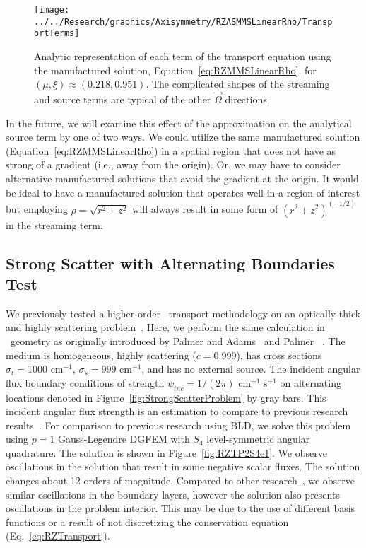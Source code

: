 \documentclass[12pt]{article}
\begin{document}
\begin{figure}
\texttt{[image: ../../Research/graphics/Axisymmetry/RZASMMSLinearRho/TransportTerms]}
\caption{Analytic representation of each term of the transport equation using the manufactured solution, Equation~\ref{eq:RZMMSLinearRho}, for $(\mu,\xi) \approx (0.218,0.951)$. The complicated shapes of the streaming and source terms are typical of the other $\vec{\Omega}$ directions.}
\label{fig:RZMMSLinearRhoAnalytic}
\end{figure}

In the future, we will examine this effect of the approximation on the analytical source term by one of two ways. We could utilize the same manufactured solution (Equation~\ref{eq:RZMMSLinearRho}) in a spatial region that does not have as strong of a gradient (i.e., away from the origin). Or, we may have to consider alternative manufactured solutions that avoid the gradient at the origin. It would be ideal to have a manufactured solution that operates well in a region of interest but employing $\rho=\sqrt{r^2+z^2}$ will always result in some form of $\left(r^2+z^2 \right)^{(-1/2)}$ in the streaming term.

\FloatBarrier

\subsection{Strong Scatter with Alternating Boundaries Test}
\label{sec:RZStrongScatter}
We previously tested a higher-order \XY\ transport methodology on an optically thick and highly scattering problem~\cite{WoodsHoDgfemXyCurved}. Here, we perform the same calculation in \RZ\ geometry as originally introduced by Palmer and Adams~\cite{PalmerCurvilinearTransport} and Palmer~
\cite{PalmerDissertation}. The medium is homogeneous, highly scattering ($c=0.999$), has cross sections $\sigma_t=1000 \text{ cm}^{-1}$, $\sigma_s = 999 \text{ cm}^{-1}$, and has no external source. The incident angular flux boundary conditions of strength $\psi_{inc} = 1/(2 \pi) \text{ cm}^{-1} \text{ s}^{-1}$ on alternating locations denoted in Figure~\ref{fig:StrongScatterProblem} by gray bars. This incident angular flux strength is an estimation to compare to previous research results~\cite{PalmerCurvilinearTransport,PalmerDissertation}. For comparison to previous research using BLD, we solve this problem using $p=1$ Gauss-Legendre DGFEM with $S_4$ level-symmetric angular quadrature. The solution is shown in Figure~\ref{fig:RZTP2S4e1}. We observe oscillations in the solution that result in some negative scalar fluxes. The solution changes about 12 orders of magnitude. Compared to other research~\cite{PalmerDissertation}, we observe similar oscillations in the boundary layers, however the solution also presents oscillations in the problem interior. This may be due to the use of different basis functions or a result of not discretizing the conservation equation (Eq.~\ref{eq:RZTransport}).
\end{document}
